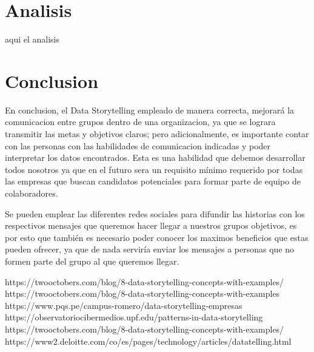 \documentclass[preprint,12pt]{elsarticle}
\begin{document}
\pagebreak
\section{Analisis}
	

aqui el analisis

\newpage

	
	
\section{Conclusion}
En conclusion, el Data Storytelling empleado de manera correcta, mejorará la comunicacion entre grupos dentro de una organizacion, ya que se lograra transmitir las metas y objetivos claros; pero adicionalmente, es importante contar con las personas con las habilidades de comunicacion indicadas y poder interpretar los datos encontrados. Esta es una habilidad que debemos desarrollar todos nosotros ya que en el futuro sera un requisito mínimo requerido por todas las empresas que buscan candidatos potenciales para formar parte de equipo de colaboradores.

Se pueden emplear las diferentes redes sociales para difundir las historias con los respectivos mensajes que queremos hacer llegar a nuestros grupos objetivos, es por esto que también es necesario poder conocer los maximos beneficios que estas pueden ofrecer, ya que de nada serviría enviar los mensajes a personas que no formen parte del grupo al que queremos llegar.

	
	

	
	
	\newpage
	
	   \begin{thebibliography}{0}
                 https://twooctobers.com/blog/8-data-storytelling-concepts-with-examples/
                  https://twooctobers.com/blog/8-data-storytelling-concepts-with-examples
                   https://www.pqs.pe/campus-romero/data-storytelling-empresas
                   https://observatoriocibermedios.upf.edu/patterns-in-data-storytelling
                     https://twooctobers.com/blog/8-data-storytelling-concepts-with-examples/
                   https://www2.deloitte.com/co/es/pages/technology/articles/datatelling.html

         \end{thebibliography}

	
\end{document}
